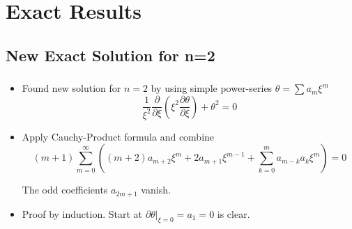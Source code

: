 \section{Exact Results}


\subsection{New Exact Solution for n=2}
\begin{frame}
	\frametitle{\insertsubsection}
	\begin{itemize}%
		\item Found new solution for $n=2$ by using simple power-series $\theta=\sum a_m\xi^m$
		\begin{equation}
			\frac{1}{\xi^2}\frac{\partial}{\partial\xi}\left(\xi^2\frac{\partial\theta}{\partial\xi}\right) +\theta^2 =0
		\end{equation}
		\item Apply Cauchy-Product formula and combine
		\begin{equation}
			(m+1)\sum\limits_{m=0}^\infty\left((m+2)a_{m+2}\xi^{m}+2a_{m+1}\xi^{m-1} + \sum\limits_{k=0}^m a_{m-k}a_k\xi^m\right) = 0
		\end{equation}
		\begin{theorem}
			The odd coefficients $a_{2m+1}$ vanish.
		\end{theorem}
		\item Proof by induction. Start at $\left.\partial\theta\right|_{\xi=0}=a_1=0$ is clear.
	\end{itemize}
\end{frame}



